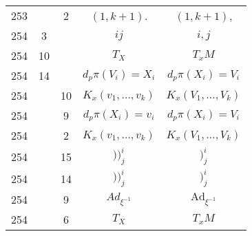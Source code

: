 \documentclass[a4paper,11pt]{article}
\newcommand{\mr}{\mathrm}
\newcommand{\ld}{\ldots}
\newcommand{\Ad}{\mr{Ad}}
\begin{document}
\begin{center}
\begin{tabular}{|c|c|c|c|c|}
    253 & &  2 & $( 1, k + 1 )$. & $( 1, k + 1 )$, \\
    254 &  3 & & $ij$ & $i, j$ \\
    254 & 10 & & $T_{ X }$ & $T_{ x }M$ \\
    254 & 14 & & $d_{ p }\pi( V_{ i } ) = X_{ i }$ & $d_{ p }\pi( X_{ i } )
                                                     = V_{ i }$ \\
    254 & & 10 & $K_{ x }( v_{ 1 }, \ld, v_{ k } )$ & $K_{ x }( V_{ 1 },
                                                      \ld, V_{ k } )$ \\
    254 & &  9 & $d_{ p }\pi( X_{ i } ) = v_{ i }$ & $d_{ p }\pi( X_{ i } )
                                                     = V_{ i }$ \\
    254 & &  2 & $K_{ x }( v_{ 1 }, \ld, v_{ k } )$ & $K_{ x }( V_{ 1 },
                                                      \ld, V_{ k } )$ \\
    254 & & 15 & $) )^{ i }_{ j }$ & $)^{ i }_{ j }$ \\
    254 & & 14 & $) )^{ i }_{ j }$ & $)^{ i }_{ j }$ \\
    254 & &  9 & $Ad_{ \xi^{ -1 } }$ & $\Ad_{ \xi^{ -1 } }$ \\
    254 & &  6 & $T_{ X }$ & $T_{ x }M$ \\
    \hline
  \end{tabular}


\end{center}
\end{document}
